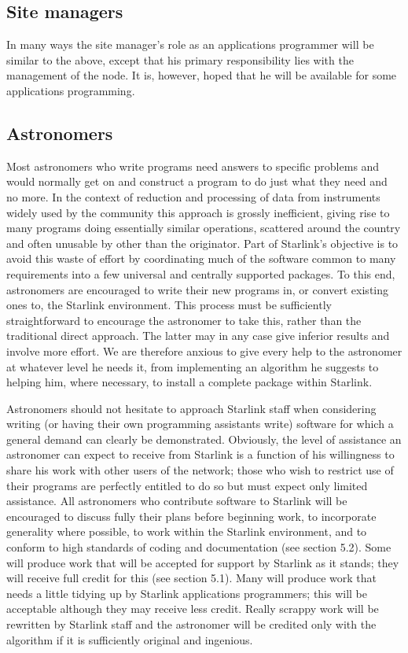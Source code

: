\subsection {Site managers}
In many ways the site manager's role as an applications programmer will be
similar to the above, except that his primary responsibility lies with the
management of the node.
It is, however, hoped that he will be available for some applications
programming.
\subsection {Astronomers}
Most astronomers who write programs need answers to specific problems and would
normally get on and construct a program to do just what they need and no more.
In the context of reduction and processing of data from instruments widely used
by the community this approach is grossly inefficient, giving rise to many
programs doing essentially similar operations, scattered around the country and
often unusable by other than the originator.
Part of Starlink's objective is to avoid this waste of effort by coordinating
much of the software common to many requirements into a few universal and
centrally supported packages.
To this end, astronomers are encouraged to write their new programs in, or
convert existing ones to, the Starlink environment.
This process must be sufficiently straightforward to encourage the astronomer
to take this, rather than the traditional direct approach.
The latter may in any case give inferior results and involve more effort.
We are therefore anxious to give every help to the astronomer at whatever level
he needs it, from implementing an algorithm he suggests to helping him, where
necessary, to install a complete package within Starlink.

Astronomers should not hesitate to approach Starlink staff when considering
writing (or having their own programming assistants write) software for which a
general demand can clearly be demonstrated.
Obviously, the level of assistance an astronomer can expect to receive from
Starlink is a function of his willingness to share his work with other users of
the network; those who wish to restrict use of their programs are perfectly
entitled to do so but must expect only limited assistance.
All astronomers who contribute software to Starlink will be encouraged to
discuss fully their plans before beginning work, to incorporate generality
where possible, to work within the Starlink environment, and to conform to
high standards of coding and documentation (see section 5.2).
Some will produce work that will be accepted for support by Starlink as it
stands; they will receive full credit for this (see section 5.1).
Many will produce work that needs a little tidying up by Starlink applications
programmers; this will be acceptable although they may receive less credit.
Really scrappy work will be rewritten by Starlink staff and the astronomer will
be credited only with the algorithm if it is sufficiently original and
ingenious.
